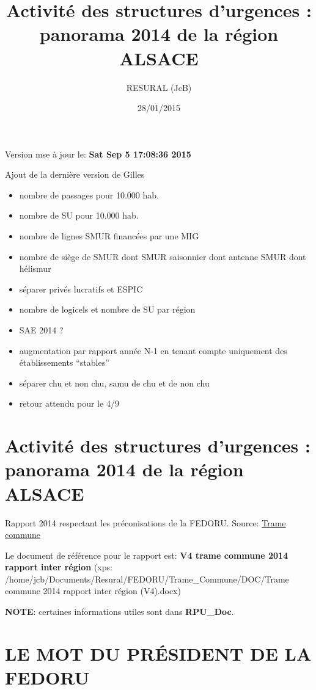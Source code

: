 \documentclass[]{article}
\title{Activité des structures d'urgences : panorama 2014 de la région ALSACE}
\author{RESURAL (JcB)}
\date{28/01/2015}
\begin{document}
\maketitle


{
\hypersetup{linkcolor=black}
\setcounter{tocdepth}{3}
\tableofcontents
}
Version mse à jour le: \textbf{Sat Sep 5 17:08:36 2015}

Ajout de la dernière version de Gilles

\begin{itemize}
\itemsep1pt\parskip0pt
\item
  nombre de passages pour 10.000 hab.
\item
  nombre de SU pour 10.000 hab.
\item
  nombre de lignes SMUR financées par une MIG
\item
  nombre de siège de SMUR dont SMUR saisonnier dont antenne SMUR dont
  hélismur
\item
  séparer privés lucratifs et ESPIC
\item
  nombre de logicels et nombre de SU par région
\item
  SAE 2014 ?
\item
  augmentation par rapport année N-1 en tenant compte uniquement des
  établissements ``stables''
\item
  séparer chu et non chu, samu de chu et de non chu
\item
  retour attendu pour le 4/9
\end{itemize}

\section{Activité des structures d'urgences : panorama 2014 de la région
ALSACE}\label{activite-des-structures-durgences-panorama-2014-de-la-region-alsace}

Rapport 2014 respectant les préconisations de la FEDORU. Source:
\href{https://docs.google.com/document/d/101LYVqVLeHZnrujfMm3aqBYfbOwx3CPEB3Y-Lbud2Ls/edit}{Trame
commune}

Le document de référence pour le rapport est: \textbf{V4 trame commune
2014 rapport inter région} (xps:
/home/jcb/Documents/Resural/FEDORU/Trame\_Commune/DOC/Trame commune 2014
rapport inter région (V4).docx)

\textbf{NOTE}: certaines informations utiles sont dans
\textbf{RPU\_Doc}.

\section{LE MOT DU PRÉSIDENT DE LA
FEDORU}\label{le-mot-du-president-de-la-fedoru}
\end{document}
